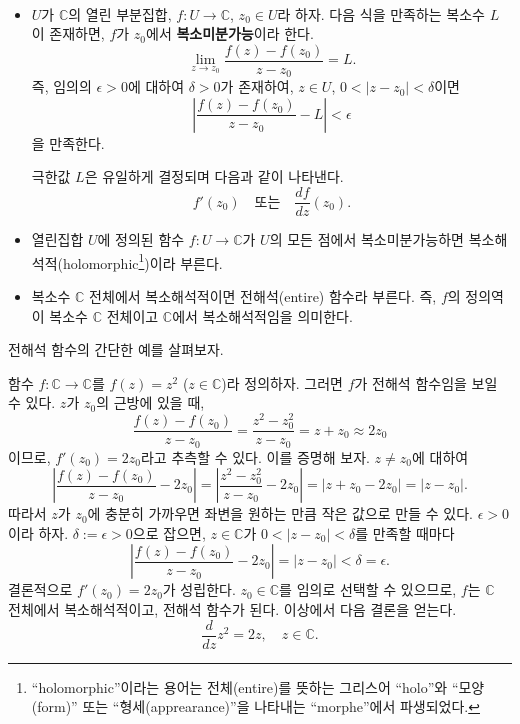 \begin{salt_definition}\label{def-2-1}
\
\begin{itemize}
\item[(1)] $U$가 $\mathbb C$의 열린 부분집합, $f: U\to \mathbb C$, $z_0\in U$라 하자.
다음 식을 만족하는 복소수 $L$이 존재하면, $f$가 $z_0$에서 {\bf 복소미분가능}이라 한다.
\[
\lim_{z\to z_0} \dfrac{f(z) - f(z_0)}{z - z_0} = L.
\]
즉, 임의의 $\epsilon>0$에 대하여 $\delta>0$가 존재하여,
$z\in U$, $0<|z-z_0|<\delta$이면 
\[
\left| \dfrac{f(z) - f(z_0)}{z - z_0} - L\right| < \epsilon
\]
을 만족한다.

극한값  $L$은 유일하게 결정되며 다음과 같이 나타낸다.
\[
f'(z_0) \quad\text{또는}\quad \dfrac{df}{dz}(z_0).
\]

\item[(2)] 열린집합 $U$에 정의된 함수 $f:U\to\mathbb C$가 $U$의 모든 점에서
복소미분가능하면 복소해석적(holomorphic\footnote{
``holomorphic''이라는 용어는 전체(entire)를 뜻하는 그리스어 ``holo''와
``모양(form)'' 또는 ``형세(apprearance)''을 나타내는 ``morphe''에서 파생되었다.
})이라 부른다.
\item[(3)] 복소수 $\mathbb C$ 전체에서 복소해석적이면 
전해석(entire) 함수라 부른다. 즉, $f$의 정의역이 복소수 $\mathbb C$ 전체이고
$\mathbb C$에서 복소해석적임을 의미한다.
\end{itemize}
\end{salt_definition}

전해석 함수의 간단한 예를 살펴보자.

\begin{salt_example} \label{example-2-1}
함수 $f:\mathbb C \to \mathbb C$를 $f(z) = z^2$ ($z\in\mathbb C$)라 정의하자.
그러면 $f$가 전해석 함수임을 보일 수 있다.
$z$가 $z_0$의 근방에 있을 때,
\[
\dfrac{f(z) - f(z_0)}{z - z_0} = \dfrac{z^2 - z_0^2}{z-z_0} = z + z_0 
\approx 2z_0
\]
이므로, $f'(z_0) = 2z_0$라고 추측할 수 있다.
이를 증명해 보자.
$z\ne z_0$에 대하여
\[
\left| \dfrac{f(z) - f(z_0)}{z - z_0} - 2z_0 \right|
= \left| \dfrac{z^2 - z_0^2}{z-z_0} - 2z_0 \right| 
= |z+z_0-2z_0| = |z-z_0|.
\]
따라서 $z$가 $z_0$에 충분히 가까우면
좌변을 원하는 만큼 작은 값으로 만들 수 있다.
$\epsilon>0$이라 하자.
$\delta:=\epsilon>0$으로 잡으면,
$z\in\mathbb C$가 $0<|z-z_0| <\delta$를 만족할 때마다
\[
\left| \dfrac{f(z) - f(z_0)}{z - z_0} - 2z_0 \right|
= |z-z_0| <\delta = \epsilon.
\]
결론적으로 $f'(z_0) = 2z_0$가 성립한다.
$z_0\in\mathbb C$를 임의로 선택할 수 있으므로,
$f$는 $\mathbb C$ 전체에서 복소해석적이고,
전해석 함수가 된다. 이상에서 다음 결론을 얻는다.
\[
\dfrac{d}{dz} z^2 = 2z, \quad z\in \mathbb C.
\]
\end{salt_example}

